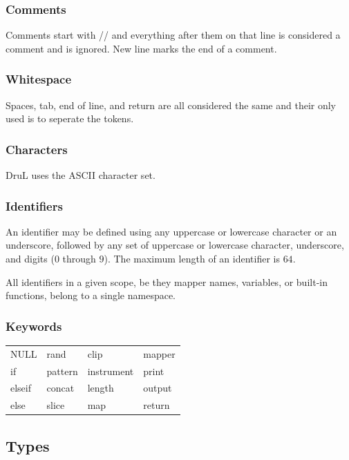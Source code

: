 \documentclass[11pt,twoside]{article}
\begin{document}
\subsubsection{Comments}
Comments start with // and everything after them on that line
is considered a comment and is ignored. New line marks the end
of a comment.
\subsubsection{Whitespace}
Spaces, tab, end of line, and return are all considered the same 
and their only used is to seperate the tokens.

\subsubsection{Characters}
DruL uses the ASCII character set.

\subsubsection{Identifiers}
An identifier may be defined using any uppercase or lowercase character
or an underscore, followed by any set of uppercase or lowercase character,
underscore, and digits ($0$ through $9$). The maximum length of an identifier
is $64$.

All identifiers in a given scope, be they mapper names, variables, or built-in functions, belong to a single namespace.

\subsubsection{Keywords}


\begin{table}[htb]
\begin{center} 
\begin{tabular}{llll} 
  NULL &    rand &    clip &        mapper \\
  if &      pattern & instrument &  print \\
  elseif &  concat &  length &      output \\
  else &    slice &   map &         return
\end{tabular}
\label{tab:keywords}
\end{center} 
\end{table}


\subsection{Types}
\end{document}
